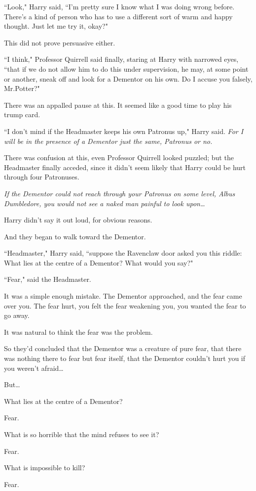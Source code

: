 ``Look," Harry said, ``I'm pretty sure I know what I was doing wrong before. There's a kind of person who has to use a different sort of warm and happy thought. Just let me try it, okay?"

This did not prove persuasive either.

``I think," Professor Quirrell said finally, staring at Harry with narrowed eyes, ``that if we do not allow him to do this under supervision, he may, at some point or another, sneak off and look for a Dementor on his own. Do I accuse you falsely, Mr.\?Potter?"

There was an appalled pause at this. It seemed like a good time to play his trump card.

``I don't mind if the Headmaster keeps his own Patronus up," Harry said. \emph{For I will be in the presence of a Dementor just the same, Patronus or no.}

There was confusion at this, even Professor Quirrell looked puzzled; but the Headmaster finally acceded, since it didn't seem likely that Harry could be hurt through four Patronuses.

\emph{If the Dementor could not reach through your Patronus on some level, Albus Dumbledore, you would not see a naked man painful to look upon{\ldots}}

Harry didn't say it out loud, for obvious reasons.

And they began to walk toward the Dementor.

``Headmaster," Harry said, ``suppose the Ravenclaw door asked you this riddle: What lies at the centre of a Dementor? What would you say?"

``Fear," said the Headmaster.

It was a simple enough mistake. The Dementor approached, and the fear came over you. The fear hurt, you felt the fear weakening you, you wanted the fear to go away.

It was natural to think the fear was the problem.

So they'd concluded that the Dementor was a creature of pure fear, that there was nothing there to fear but fear itself, that the Dementor couldn't hurt you if you weren't afraid{\ldots}

But{\ldots}

\begin{em}
What lies at the centre of a Dementor?

Fear.

What is so horrible that the mind refuses to see it?

Fear.

What is impossible to kill?

Fear.
\end{em}


